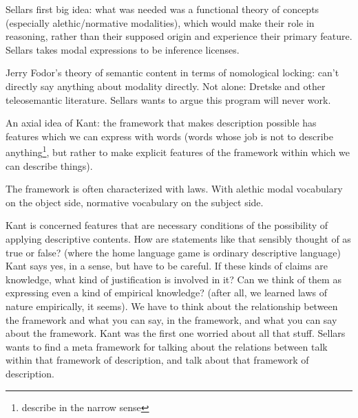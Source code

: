 Sellars first big idea: what was needed was a functional theory of concepts (especially alethic/normative modalities), which would make their role in reasoning, rather than their supposed origin and experience their primary feature. Sellars takes modal expressions to be inference licenses.


Jerry Fodor's theory of semantic content in terms of nomological locking: can't directly say anything about modality directly. Not alone: Dretske and other teleosemantic literature. Sellars wants to argue this program will never work.

An axial idea of Kant: the framework that makes description possible has features which we can express with words (words whose job is not to describe anything\footnote{describe in the narrow sense}, but rather to make explicit features of the framework within which we can describe things).

The framework is often characterized with laws. With alethic modal vocabulary on the object side, normative vocabulary on the subject side.

Kant is concerned features that are necessary conditions of the possibility of applying descriptive contents. How are statements like that sensibly thought of as true or false? (where the home language game is ordinary descriptive language) Kant says yes, in a sense, but have to be careful. If these kinds of claims are knowledge, what kind of justification is involved in it? Can we think of them as expressing even a kind of empirical knowledge? (after all, we learned laws of nature empirically, it seems). We have to think about the relationship between the framework and what you can say, in the framework, and what you can say about the framework. Kant was the first one worried about all that stuff. Sellars wants to find a meta framework for talking about the relations between talk within that framework of description, and talk about that framework of description.

